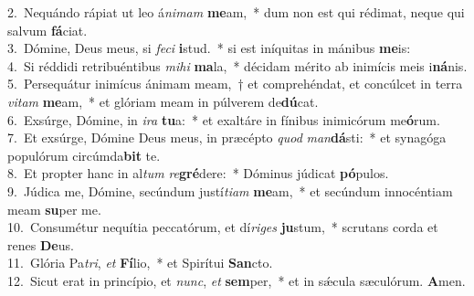 {2.~}Nequándo rápiat ut leo á\textit{ni}\textit{mam} \textbf{me}am,~* dum non est qui rédimat, neque qui salvum \textbf{fá}ciat.\\
{3.~}Dómine, Deus meus, si \textit{fe}\textit{ci} \textbf{i}stud.~* si est iníquitas in mánibus \textbf{me}is:\\
{4.~}Si réddidi retribuéntibus \textit{mi}\textit{hi} \textbf{ma}la,~* décidam mérito ab inimícis meis i\textbf{ná}nis.\\
{5.~}Persequátur inimícus ánimam meam,~† et comprehéndat, et concúlcet in terra \textit{vi}\textit{tam} \textbf{me}am,~* et glóriam meam in púlverem de\textbf{dú}cat.\\
{6.~}Exsúrge, Dómine, in \textit{i}\textit{ra} \textbf{tu}a:~* et exaltáre in fínibus inimicórum me\textbf{ó}rum.\\
{7.~}Et exsúrge, Dómine Deus meus, in præcépto \textit{quod} \textit{man}\textbf{dá}sti:~* et synagóga populórum circúmda\textbf{bit} te.\\
{8.~}Et propter hanc in al\textit{tum} \textit{re}\textbf{gré}dere:~* Dóminus júdicat \textbf{pó}pulos.\\
{9.~}Júdica me, Dómine, secúndum justí\textit{ti}\textit{am} \textbf{me}am,~* et secúndum innocéntiam meam \textbf{su}per me.\\
{10.~}Consumétur nequítia peccatórum, et dí\textit{ri}\textit{ges} \textbf{ju}stum,~* scrutans corda et renes \textbf{De}us.\\
{11.~}Glória Pa\textit{tri}, \textit{et} \textbf{Fí}lio,~* et Spirítui \textbf{San}cto.\\
{12.~}Sicut erat in princípio, et \textit{nunc}, \textit{et} \textbf{sem}per,~* et in sǽcula sæculórum. \textbf{A}men.\\
